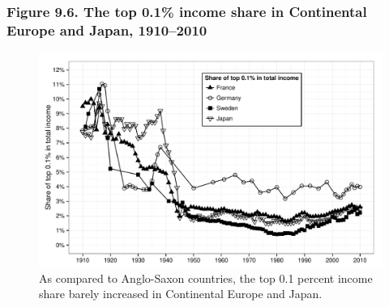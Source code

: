 \documentclass[t]{beamer}\usepackage[]{graphicx}\usepackage[]{color}
\newenvironment{knitrout}{}{} %
\begin{document}
\begin{frame}[label=Figure_9_6]
\frametitle{Figure 9.6. The top 0.1\% income share in Continental Europe and Japan, 1910--2010}
\begin{figure}[t]
\begin{minipage}[b]{\textwidth}
\centering
\begin{knitrout}\footnotesize
{}\color{fgcolor}

{\centering \includegraphics[width=1\linewidth]{figures/bw/Figure_9_6} 

}



\end{knitrout}
\caption{As compared to Anglo-Saxon countries, the top 0.1 percent income share barely increased in Continental Europe and Japan.}
\end{minipage}
\end{figure}
\end{frame}
\end{document}
